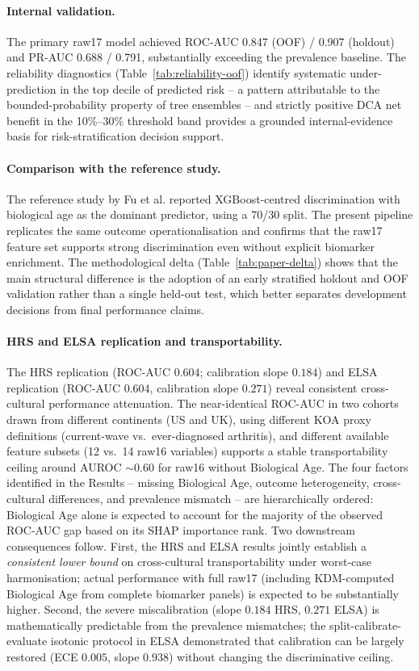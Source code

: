 \documentclass[11pt,a4paper]{article}
\begin{document}
\paragraph{Internal validation.}
The primary raw17 model achieved ROC-AUC 0.847 (OOF) / 0.907 (holdout) and PR-AUC 0.688 / 0.791,
substantially exceeding the prevalence baseline. The reliability diagnostics
(Table~\ref{tab:reliability-oof}) identify systematic under-prediction in the top decile of predicted
risk -- a pattern attributable to the bounded-probability property of tree ensembles\cite{NiculescuMizil2005}
-- and strictly positive DCA net benefit in the 10\%--30\% threshold band provides a grounded
internal-evidence basis for risk-stratification decision support.

\paragraph{Comparison with the reference study.}
The reference study by Fu et al.\cite{Fu2025} reported XGBoost-centred discrimination with biological
age as the dominant predictor, using a 70/30 split. The present pipeline replicates the same outcome
operationalisation and confirms that the raw17 feature set supports strong discrimination even without
explicit biomarker enrichment. The methodological delta (Table~\ref{tab:paper-delta}) shows that the
main structural difference is the adoption of an early stratified holdout and OOF validation rather
than a single held-out test, which better separates development decisions from final performance claims.

\paragraph{HRS and ELSA replication and transportability.}
The HRS replication (ROC-AUC $0.604$; calibration slope $0.184$) and ELSA replication
(ROC-AUC $0.604$, calibration slope $0.271$) reveal consistent cross-cultural performance
attenuation. The near-identical ROC-AUC in two cohorts drawn from different continents (US
and UK), using different KOA proxy definitions (current-wave vs.\ ever-diagnosed arthritis),
and different available feature subsets (12 vs.\ 14 raw16 variables) supports a stable
transportability ceiling around AUROC ${\sim}0.60$ for raw16 without Biological Age. The four
factors identified in the Results -- missing Biological Age, outcome heterogeneity, cross-cultural
differences, and prevalence mismatch -- are hierarchically ordered: Biological Age alone is
expected to account for the majority of the observed ROC-AUC gap based on its SHAP importance
rank. Two downstream consequences follow. First, the HRS and ELSA results jointly establish a
\emph{consistent lower bound} on cross-cultural transportability under worst-case harmonisation;
actual performance with full raw17 (including KDM-computed Biological Age from complete
biomarker panels) is expected to be substantially higher. Second, the severe miscalibration
(slope $0.184$ HRS, $0.271$ ELSA) is mathematically predictable from the prevalence mismatches;
the split-calibrate-evaluate isotonic protocol in ELSA demonstrated that calibration can be
largely restored (ECE $0.005$, slope $0.938$) without changing the discriminative ceiling.
\end{document}
